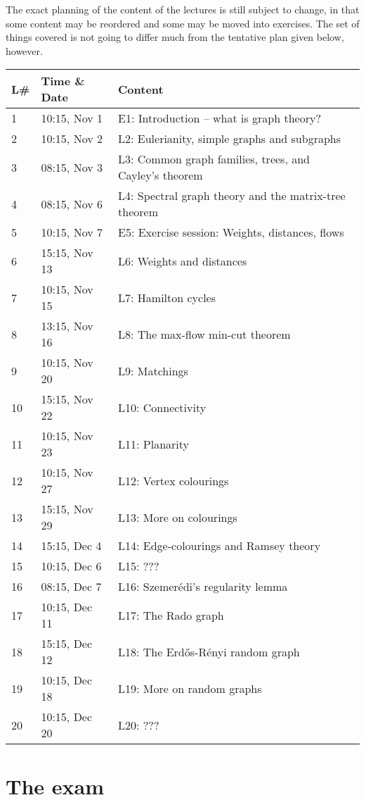 \documentclass{tufte-handout}
\begin{document}
The exact planning of the content of the lectures is still subject to change, in that some content may be reordered and some may be moved into exercises. The set of things covered is not going to differ much from the tentative plan given below, however.

\begin{table}[h]
\begin{tabularx}{\textwidth}{llX}
L\# & Time \& Date      & Content \\ 
\midrule
1  & 10:15, Nov 1 & E1: Introduction -- what is graph theory?\\
2  & 10:15, Nov 2 & L2: Eulerianity, simple graphs and subgraphs\\
3  & 08:15, Nov 3 & L3: Common graph families, trees, and Cayley's theorem\\
4  & 08:15, Nov 6 & L4: Spectral graph theory and the matrix-tree theorem\\
5  & 10:15, Nov 7 & E5: Exercise session: Weights, distances, flows\\
6  & 15:15, Nov 13 & L6: Weights and distances\\
7  & 10:15, Nov 15 & L7: Hamilton cycles\\
8  & 13:15, Nov 16 & L8: The max-flow min-cut theorem\\
9  & 10:15, Nov 20 & L9: Matchings\\
10 & 15:15, Nov 22 & L10: Connectivity\\
11 & 10:15, Nov 23 & L11: Planarity\\
12 & 10:15, Nov 27 & L12: Vertex colourings\\
13 & 15:15, Nov 29 & L13: More on colourings\\
14 & 15:15, Dec 4 & L14: Edge-colourings and Ramsey theory\\
15 & 10:15, Dec 6 & L15: ???\\
16 & 08:15, Dec 7 & L16: Szemerédi's regularity lemma\\
17 & 10:15, Dec 11 & L17: The Rado graph\\
18 & 15:15, Dec 12 & L18: The Erd\H{o}s-Rényi random graph\\
19 & 10:15, Dec 18 & L19: More on random graphs\\
20 & 10:15, Dec 20 & L20: ???
\end{tabularx}
\end{table}

\section{The exam}
\end{document}
